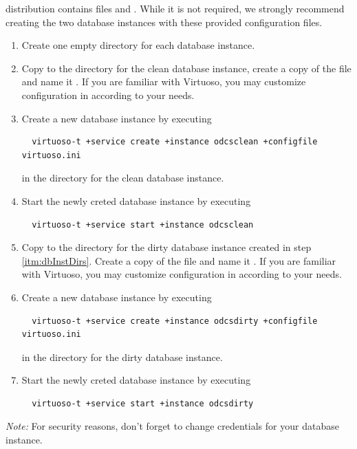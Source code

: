 \odcs distribution contains files  and . While it is not required, we strongly recommend creating the two database instances with these provided configuration files.

\begin{enumerate}
  \item \label{itm:dbInstDirs} Create one empty directory for each database instance.
  \item \label{itm:dbInstCleanStart} Copy  to the directory for the clean database instance, create a copy of the file and name it . If you are familiar with Virtuoso, you may customize configuration in  according to your needs. 
  \item Create a new database instance by executing
\begin{verbatim}
  virtuoso-t +service create +instance odcsclean +configfile virtuoso.ini
\end{verbatim}
    in the directory for the clean database instance.
    \item \label{itm:dbInstCleanEnd} Start the newly creted database instance by executing
\begin{verbatim}
  virtuoso-t +service start +instance odcsclean
\end{verbatim}
  
  \item Copy  to the directory for the dirty database instance created in step \ref{itm:dbInstDirs}. Create a copy of the file and name it . If you are familiar with Virtuoso, you may customize configuration in  according to your needs. 
  \item Create a new database instance by executing
\begin{verbatim}
  virtuoso-t +service create +instance odcsdirty +configfile virtuoso.ini
\end{verbatim}
    in the directory for the dirty database instance.
    \item  Start the newly creted database instance by executing
\begin{verbatim}
  virtuoso-t +service start +instance odcsdirty
\end{verbatim}
\end{enumerate}


\textit{Note:} For security reasons, don't forget to change credentials for your database instance.


